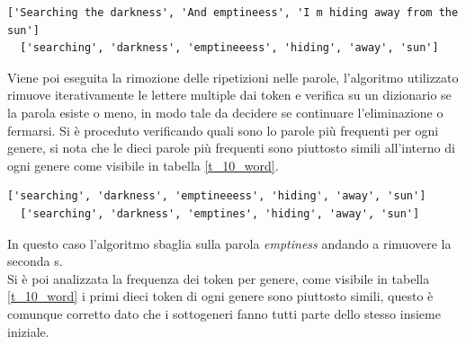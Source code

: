\documentclass[technote]{IEEEtran}
\begin{document}
\begin{lstlisting}[basicstyle=\tiny]
  ['Searching the darkness', 'And emptineess', 'I m hiding away from the sun']  
  ['searching', 'darkness', 'emptineeess', 'hiding', 'away', 'sun']
\end{lstlisting}
Viene poi eseguita la rimozione delle ripetizioni nelle parole, l'algoritmo utilizzato rimuove iterativamente le lettere multiple dai token e verifica su un dizionario se la parola esiste o meno, in modo tale da decidere se continuare l'eliminazione o fermarsi.
Si è proceduto verificando quali sono lo parole più frequenti per ogni genere, si nota che le dieci parole più frequenti sono piuttosto simili all'interno di ogni genere come visibile in tabella \ref{t_10_word}.

\begin{lstlisting}[basicstyle=\tiny]
  ['searching', 'darkness', 'emptineeess', 'hiding', 'away', 'sun']
  ['searching', 'darkness', 'emptines', 'hiding', 'away', 'sun']
\end{lstlisting}
In questo caso l'algoritmo sbaglia sulla parola \textit{emptiness} andando a rimuovere la seconda s. \\
Si è poi analizzata la frequenza dei token per genere, come visibile in tabella \ref{t_10_word} i primi dieci token di ogni genere sono piuttosto simili, questo è comunque corretto dato che i sottogeneri fanno tutti parte dello stesso insieme iniziale.
\end{document}
